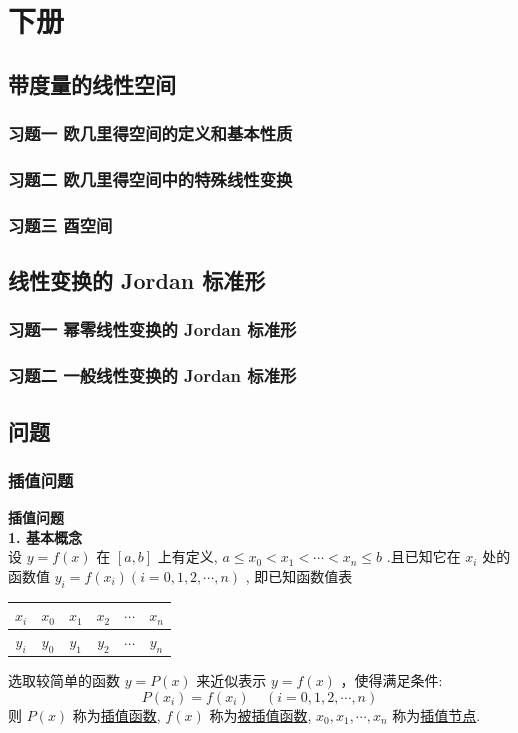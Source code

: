 \documentclass[11pt,a4paper,openany,oneside]{book}
\begin{document}
\part{下册}

\chapter{带度量的线性空间}
\section{习题一 \quad 欧几里得空间的定义和基本性质}	
\section{习题二 \quad 欧几里得空间中的特殊线性变换}
\section{习题三 \quad 酉空间}

\chapter{线性变换的 Jordan 标准形}
\section{习题一 \quad 幂零线性变换的 Jordan 标准形}	
\section{习题二 \quad 一般线性变换的 Jordan 标准形}

\chapter{问题}
\section{插值问题}
\textbf{\large{插值问题}} \\
\textbf{1. 基本概念} \\ 
设 $ y=f(x) $ 在 $ [a,b] $ 上有定义,  $ a \leq x_0 < x_1 < \cdots < x_n \leq b $ .且已知它在 $ x_i $ 处的函数值 $ y_i = f(x_i) (i=0, 1, 2, \cdots, n) $ , 即已知函数值表
\begin{center}
	\begin{tabular}{c|ccccc}
		 $ x_i $  &  $ x_0 $  &  $ x_1 $  &  $ x_2 $  &  $ \cdots $  &  $ x_n $  \\
		\hline
		 $ y_i $  &  $ y_0 $  &  $ y_1 $  &  $ y_2 $  &  $ \cdots $  &  $ y_n $  \\
	\end{tabular}
\end{center}
选取较简单的函数 $ y = P(x) $ 来近似表示 $ y = f(x) $ ，使得满足条件:
 $$  P(x_i) = f(x_i) \ \ \ \ \ (i = 0, 1, 2, \cdots, n)  $$ 
则 $ P(x) $ 称为\underline{插值函数},  $ f(x) $ 称为\underline{被插值函数},  $ x_0, x_1, \cdots, x_n $ 称为\underline{插值节点}. \\
\end{document}
